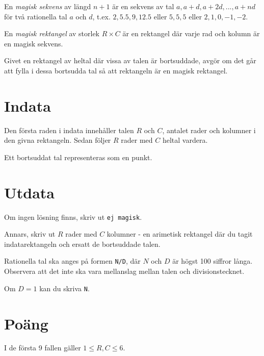 
En \emph{magisk sekvens} av längd $n + 1$ är en sekvens av tal $a, a + d, a + 2d, ..., a + nd$ för två rationella tal $a$ och $d$, t.ex. $2, 5.5, 9, 12.5$ eller $5, 5, 5$ eller $2, 1, 0, -1, -2$.

En \emph{magisk rektangel} av storlek $R \times C$ är en rektangel där varje rad och kolumn är en magisk sekvens.

Givet en rektangel av heltal där vissa av talen är bortsuddade, avgör om det går att fylla i dessa bortsudda tal så att rektangeln är en magisk rektangel.

\section*{Indata}
Den första raden i indata innehåller talen $R$ och $C$, antalet rader och kolumner i den givna rektangeln. Sedan följer $R$ rader med $C$ heltal vardera.

Ett bortsuddat tal representeras som en punkt.

\section*{Utdata}
Om ingen lösning finns, skriv ut \texttt{ej magisk}.

Annars, skriv ut $R$ rader med $C$ kolumner - en arimetisk rektangel där du tagit indatarektangeln och ersatt de bortsuddade talen.

Rationella tal ska anges på formen \texttt{N/D}, där $N$ och $D$ är högst 100 siffror långa. Observera att det inte ska vara mellanslag mellan talen och divisionstecknet.

Om $D = 1$ kan du skriva \texttt{N}.

\section*{Poäng}

I de första 9 fallen gäller $1 \le R, C \le 6$.

